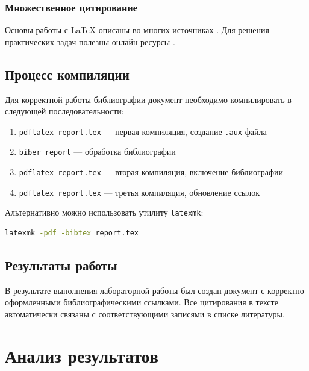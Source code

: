 \documentclass[12pt, a4paper]{article}
\begin{document}
\subsubsection{Множественное цитирование}

Основы работы с LaTeX описаны во многих источниках \parencite{knuth1984, lamport1994, mittelbach2004}. Для решения практических задач полезны онлайн-ресурсы \parencite{overleaf-docs, latex-project, tex-stackexchange}.

\subsection{Процесс компиляции}

Для корректной работы библиографии документ необходимо компилировать в следующей последовательности:

\begin{enumerate}
  \item \texttt{pdflatex report.tex} — первая компиляция, создание \texttt{.aux} файла
  \item \texttt{biber report} — обработка библиографии
  \item \texttt{pdflatex report.tex} — вторая компиляция, включение библиографии
  \item \texttt{pdflatex report.tex} — третья компиляция, обновление ссылок
\end{enumerate}

Альтернативно можно использовать утилиту \texttt{latexmk}:

\begin{lstlisting}[language=bash, caption={Автоматическая компиляция с latexmk}]
latexmk -pdf -bibtex report.tex
\end{lstlisting}

\subsection{Результаты работы}

В результате выполнения лабораторной работы был создан документ с корректно оформленными библиографическими ссылками. Все цитирования в тексте автоматически связаны с соответствующими записями в списке литературы.

\section{Анализ результатов}
\end{document}
